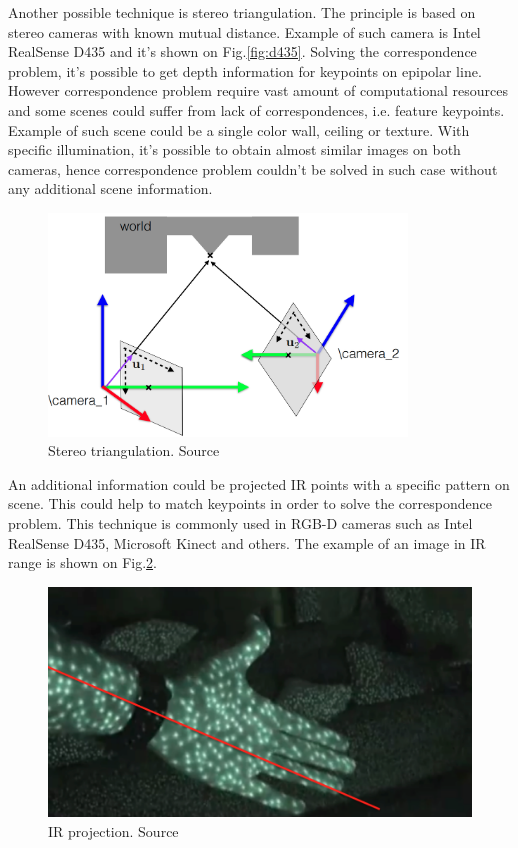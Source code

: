 \documentclass{ctuthesis}
\begin{document}
Another possible technique is stereo triangulation. The principle is based on stereo cameras with known mutual distance. Example of such camera is Intel RealSense D435 and it's shown on Fig.\ref{fig:d435}. Solving the correspondence problem, it's possible to get depth information for keypoints on epipolar line. However correspondence problem require vast amount of computational resources and some scenes could suffer from lack of correspondences, i.e. feature keypoints. Example of such scene could be a single color wall, ceiling or texture. With specific illumination, it's possible to obtain almost similar images on both cameras, hence correspondence problem couldn't be solved in such case without any additional scene information.

\begin{figure}[htbp]
    \centering
    \includegraphics[width=0.85\textwidth]{stereo.png}
    \caption{Stereo triangulation. Source \cite{KZ-aro}}
    \label{fig:stereo}
\end{figure}

An additional information could be projected IR points with a specific pattern on scene. This could help to match keypoints in order to solve the correspondence problem. This technique is commonly used in RGB-D cameras such as Intel RealSense D435, Microsoft Kinect and others. The example of an image in IR range is shown on Fig.\ref{fig:ir_proj}.

\begin{figure}[htbp]
    \centering
    \includegraphics[width=\textwidth]{IR_projection.png}
    \caption{IR projection. Source \cite{KZ-aro}}
    \label{fig:ir_proj}
\end{figure}
\end{document}
